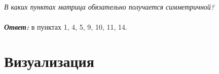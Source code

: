 \documentclass[a5paper, 10pt]{article}
\theoremstyle{definition}
\theoremstyle{plain}
\theoremstyle{remark}
\begin{document}
\subsection{}
\textit{В каких пунктах матрица обязательно получается симметричной?}\\
\\
\textbf{\textit{Ответ:}} в пунктах 1, 4, 5, 9, 10, 11, 14.





\newpage
\section{Визуализация}
\end{document}
